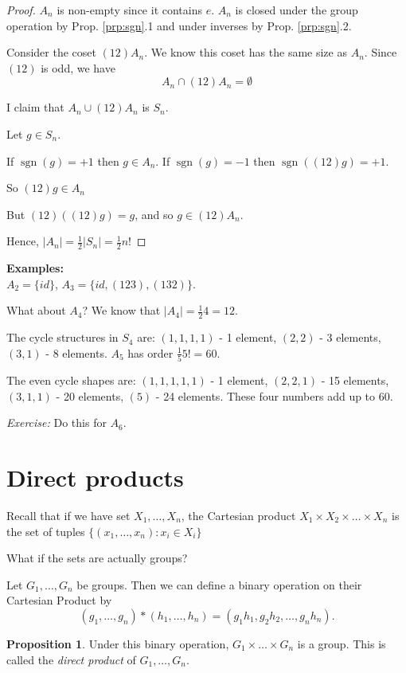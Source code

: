 \documentclass{article}
\theoremstyle{definition}
\newtheorem{proposition}{Proposition}
\DeclareMathOperator{\sgn}{sgn}
\begin{document}
\begin{proof}
  $A_n$ is non-empty since it contains $e$. $A_n$ is closed under the group operation by Prop. \ref{prp:sgn}.1 and under inverses by Prop. \ref{prp:sgn}.2.

  Consider the coset $(12) A_n$. We know this coset has the same size as $A_n.$ Since $(1 2)$ is odd, we have
\begin{equation*}
  A_n \cap (1 2) A_n  = \emptyset
\end{equation*}

I claim that $A_n \cup (1 2) A_n $ is $S_n$. 

Let $g \in S_n$.

If $\sgn(g) = +1$ then $g \in A_n$.
If $\sgn(g) = -1$ then $\sgn\left( (12) g \right)= +1$.

So $(12)g \in A_n$

But $(1 2)\left( (1 2) g \right)=g$, and so $g \in (1 2)A_n$.

Hence, $|A_n|=\frac{1}{2}|S_n|=\frac{1}{2}n!$

\end{proof}

\textbf{Examples:}\\
$A_2 = \{ id \}$, $A_3 = \{id, (123), (132)\}$.

What about $A_4$? We know that $|A_4|=\frac{1}{2}4=12$.

The cycle structures in $S_4$ are:
$(1,1,1,1)$ - 1 element, $(2,2)$ - 3 elements, $(3,1)$ - 8 elements.
$A_5$ has order $\frac{1}{5}5! = 60$.

The even cycle shapes are:
$(1,1,1,1,1)$ - 1 element, $(2,2,1)$ - 15 elements, $(3,1,1)$ - 20 elements, $(5)$ - 24 elements. These four numbers add up to 60.

\emph{Exercise:} Do this for $A_6$.

\section{Direct products}
Recall that if we have set $X_1, \ldots, X_n$, the Cartesian product 
$X_1 \times X_2 \times \ldots \times X_n$ is the set of tuples $\{(x_1, \ldots,x_n) : x_i \in X_i\}$

What if the sets are actually groups?

Let $G_1 , \ldots, G_n$ be groups. Then we can define a binary operation on their Cartesian Product by
$$(g_1, \ldots, g_n) * (h_1, \ldots , h_n) = (g_1h_1, g_2h_2, \ldots, g_nh_n).$$
\begin{proposition}
Under this binary operation, $G_1 \times \ldots \times G_n$ is a group. This is called the \textit{direct product} of $G_1 , \ldots, G_n$.
\end{proposition}
\end{document}
